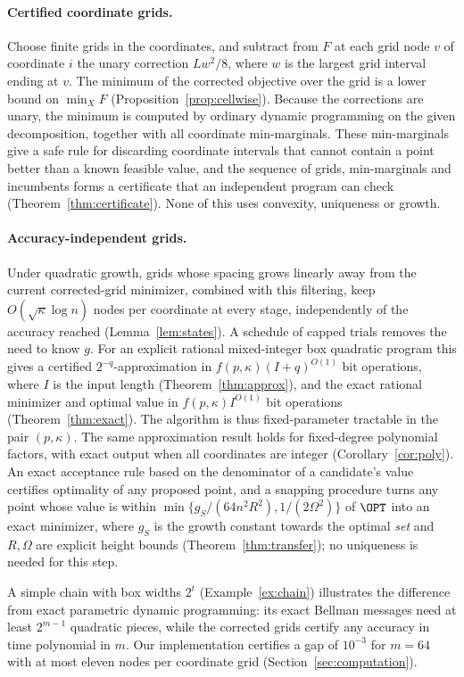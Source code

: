 \paragraph{Certified coordinate grids.}
Choose finite grids in the coordinates, and subtract from $F$ at each grid
node $v$ of coordinate $i$ the unary correction $L w^2/8$, where $w$ is the
largest grid interval ending at $v$. The minimum of the corrected objective
over the grid is a lower bound on $\min_XF$ (Proposition~\ref{prop:cellwise}).
Because the corrections are unary, the minimum is computed by ordinary
dynamic programming on the given decomposition, together with all
coordinate min-marginals. These min-marginals give a safe rule for
discarding coordinate intervals that cannot contain a point better than a
known feasible value, and the sequence of grids, min-marginals and
incumbents forms a certificate that an independent program can check
(Theorem~\ref{thm:certificate}). None of this uses convexity, uniqueness or
growth.

\paragraph{Accuracy-independent grids.}
Under quadratic growth, grids whose spacing grows linearly away from the
current corrected-grid minimizer, combined with this filtering, keep
$O(\sqrt\kappa\log n)$ nodes per coordinate at every stage, independently
of the accuracy reached (Lemma~\ref{lem:states}). A schedule of capped
trials removes the need to know $g$. For an explicit rational
mixed-integer box quadratic program this gives a certified
$2^{-q}$-approximation in $f(p,\kappa)(I+q)^{O(1)}$ bit operations, where
$I$ is the input length (Theorem~\ref{thm:approx}), and the exact rational
minimizer and optimal value in $f(p,\kappa)I^{O(1)}$ bit operations
(Theorem~\ref{thm:exact}). The algorithm is thus fixed-parameter tractable
in the pair $(p,\kappa)$. The same approximation result holds for
fixed-degree polynomial factors, with exact output when all coordinates are
integer (Corollary~\ref{cor:poly}). An exact acceptance rule based on the
denominator of a candidate's value certifies optimality of any proposed
point, and a snapping procedure turns any point whose value is within
$\min\{g_S/(64n^2R^2),1/(2\Omega^2)\}$ of $\OPT$ into an exact minimizer,
where $g_S$ is the growth constant towards the optimal \emph{set} and
$R,\Omega$ are explicit height bounds (Theorem~\ref{thm:transfer}); no
uniqueness is needed for this step.

A simple chain with box widths $2^t$ (Example~\ref{ex:chain}) illustrates
the difference from exact parametric dynamic programming: its exact Bellman
messages need at least $2^{m-1}$ quadratic pieces, while the corrected
grids certify any accuracy in time polynomial in $m$. Our implementation
certifies a gap of $10^{-3}$ for $m=64$ with at most eleven nodes per
coordinate grid (Section~\ref{sec:computation}).

